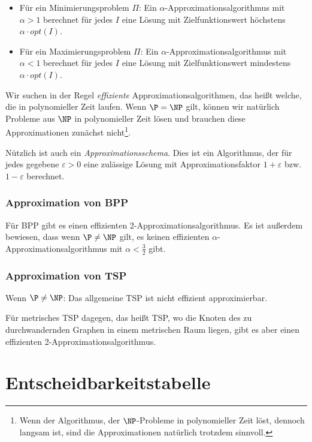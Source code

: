 \documentclass[a4paper,parskip=half*,DIV=7,fontsize=11pt]{scrartcl}
\begin{document}
\begin{itemize}
\item Für ein Minimierungsproblem $\Pi$: Ein $\alpha$-Approximationsalgorithmus mit $\alpha > 1$ berechnet für jedes $I$ eine Lösung mit Zielfunktionswert höchstens $\alpha \cdot opt(I)$.
\item Für ein Maximierungsproblem $\Pi$: Ein $\alpha$-Approximationsalgorithmus mit $\alpha < 1$ berechnet für jedes $I$ eine Lösung mit Zielfunktionswert mindestens $\alpha \cdot opt(I)$.
\end{itemize}

Wir suchen in der Regel \emph{effiziente} Approximationsalgorithmen, das heißt welche, die in polynomieller Zeit laufen. Wenn $\P = \NP$ gilt, können wir natürlich Probleme aus $\NP$ in polynomieller Zeit lösen und brauchen diese Approximationen zunächst nicht\footnote{Wenn der Algorithmus, der $\NP$-Probleme in polynomieller Zeit löst, dennoch langsam ist, sind die Approximationen natürlich trotzdem sinnvoll.}.

Nützlich ist auch ein \emph{Approximationsschema}. Dies ist ein Algorithmus, der für jedes gegebene $\varepsilon > 0$ eine zulässige Lösung mit Approximationsfaktor $1 + \varepsilon$ bzw. $1 - \varepsilon$ berechnet.

\subsubsection{Approximation von BPP}

Für BPP gibt es einen effizienten 2-Approximationsalgorithmus. Es ist außerdem bewiesen, dass wenn $\P \neq \NP$ gilt, es keinen effizienten $\alpha$-Approximationsalgorithmus mit $\alpha < \frac{3}{2}$ gibt.

\subsubsection{Approximation von TSP}

Wenn $\P \neq \NP$: Das allgemeine TSP ist nicht effizient approximierbar.

Für metrisches TSP dagegen, das heißt TSP, wo die Knoten des zu durchwandernden Graphen in einem metrischen Raum liegen, gibt es aber einen effizienten 2-Approximationsalgorithmus.

\appendix

\section{Entscheidbarkeitstabelle}
\label{sec:entscheidbarkeitstabelle}
\end{document}
